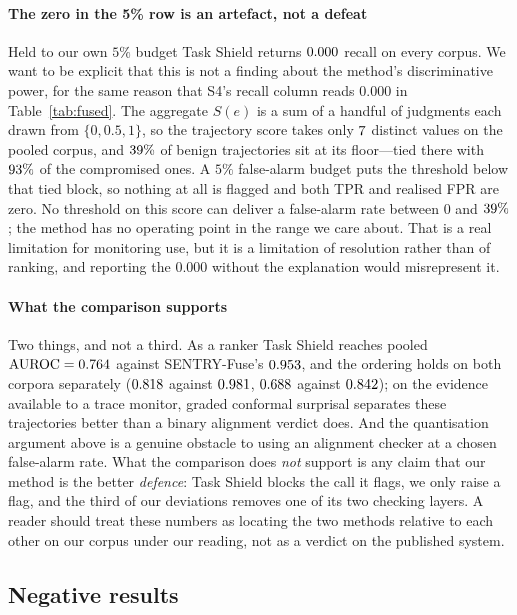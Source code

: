 \documentclass[preprint,12pt,number]{elsarticle}
\theoremstyle{definition}
\begin{document}
\paragraph{The zero in the 5\% row is an artefact, not a defeat} Held to our own
$5\%$ budget Task Shield returns $0.000$ recall on every corpus. We want to be
explicit that this is not a finding about the method's discriminative power, for
the same reason that S4's recall column reads $0.000$ in
Table~\ref{tab:fused}. The aggregate $S(e)$ is a sum of a handful of judgments each
drawn from $\{0, 0.5, 1\}$, so the trajectory score takes only $7$
distinct values on the pooled corpus, and $39\%$ of benign
trajectories sit at its floor---tied there with $93\%$ of the
compromised ones. A $5\%$ false-alarm budget puts the threshold below that tied
block, so nothing at all is flagged and both TPR and realised FPR are zero. No
threshold on this score can deliver a false-alarm rate between $0$ and
$39\%$; the method has no operating point in the range we care
about. That is a real limitation for monitoring use, but it is a limitation of
resolution rather than of ranking, and reporting the $0.000$ without the
explanation would misrepresent it.

\paragraph{What the comparison supports} Two things, and not a third. As a ranker
Task Shield reaches pooled $\mathrm{AUROC} = 0.764$ against SENTRY-Fuse's
$0.953$, and the ordering holds on both corpora separately
($0.818$ against $0.981$, $0.688$ against $0.842$); on
the evidence available to a trace monitor, graded conformal surprisal separates
these trajectories better than a binary alignment verdict does. And the
quantisation argument above is a genuine obstacle to using an alignment checker at
a chosen false-alarm rate. What the comparison does \emph{not} support is any
claim that our method is the better \emph{defence}: Task Shield blocks the call it
flags, we only raise a flag, and the third of our deviations removes one of its two
checking layers. A reader should treat these numbers as locating the two methods
relative to each other on our corpus under our reading, not as a verdict on the
published system.


\subsection{Negative results}\label{sec:negatives}
\end{document}
